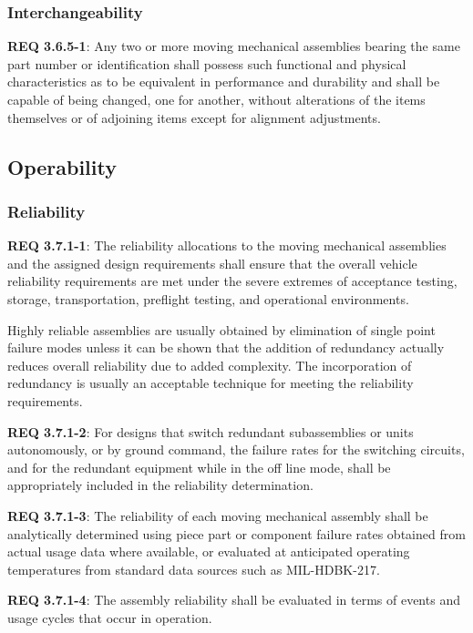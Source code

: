 \documentclass[12pt]{article}
\begin{document}
\subsubsection{Interchangeability} %
\noindent \textbf{REQ 3.6.5-1}: Any two or more moving mechanical assemblies bearing the same part number or identification shall possess such functional and physical characteristics as to be equivalent in performance and durability and shall be capable of being changed, one for another, without alterations of the items themselves or of adjoining items except for alignment adjustments.


\clearpage
\subsection{Operability} %
\subsubsection{Reliability} %
\noindent \textbf{REQ 3.7.1-1}: The reliability allocations to the moving mechanical assemblies and the assigned design requirements shall ensure that the overall vehicle reliability requirements are met under the severe extremes of acceptance testing, storage, transportation, preflight testing, and operational environments. 

Highly reliable assemblies are usually obtained by elimination of single point failure modes unless it can be shown that the addition of redundancy actually reduces overall reliability due to added complexity. 
The incorporation of redundancy is usually an acceptable technique for meeting the reliability requirements. 

\noindent \textbf{REQ 3.7.1-2}: For designs that switch redundant subassemblies or units autonomously, or by ground command, the failure rates for the switching circuits, and for the redundant equipment while in the off line mode, shall be appropriately included in the reliability determination. 

\noindent \textbf{REQ 3.7.1-3}: The reliability of each moving mechanical assembly shall be analytically determined using piece part or component failure rates obtained from actual usage data where available, or evaluated at anticipated operating temperatures from standard data sources such as MIL-HDBK-217. 

\noindent \textbf{REQ 3.7.1-4}: The assembly reliability shall be evaluated in terms of events and usage cycles that occur in operation. 
\end{document}
